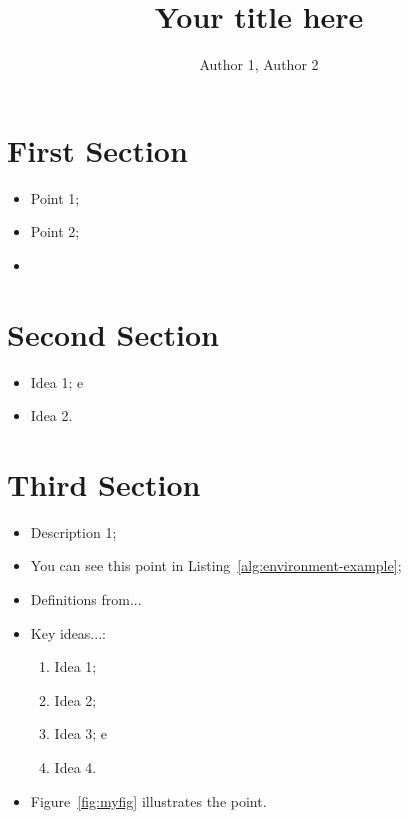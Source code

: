 \documentclass[a0,portrait]{lab-poster}
\title{Your title here}
\author{Author 1, Author 2}
\begin{document}
\maketitle


\begin{multicols}{2} 
\section*{First Section}

\begin{itemize}
	\item Point 1;
	\item Point 2;
	\item 
\end{itemize}

\section*{Second Section}

\begin{itemize}
	\item Idea 1; e
	\item Idea 2.
\end{itemize}

\section*{Third Section}

\begin{itemize}
	\item Description 1;
	\item You can see this point in Listing~\ref{alg:environment-example};
	\item Definitions from...
\end{itemize}

\vspace{13mm}


\begin{itemize}
	\item Key ideas...:
	\begin{enumerate}
		\item Idea 1;
		\item Idea 2; 
		\item Idea 3; e
		\item Idea 4.
	\end{enumerate}	
	\item Figure~\ref{fig:myfig} illustrates the point.
\end{itemize}
\vspace{13mm}


\end{multicols}
\end{document}
